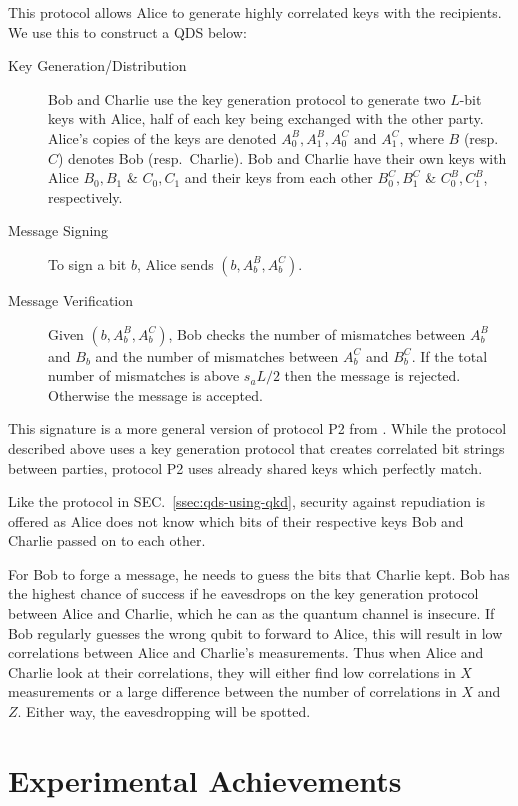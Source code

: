 \documentclass[%
 reprint,
 amsmath,amssymb,
 aps,
 pra,
]{revtex4-1}
\begin{document}
This protocol allows Alice to generate highly correlated keys with the recipients. We use this to construct a QDS below:

\begin{description}
\item[Key Generation/Distribution]Bob and Charlie use the key generation protocol to generate two $L$-bit keys with Alice, half of each key being exchanged with the other party. Alice's copies of the keys are denoted $A^B_0, A^B_1, A^C_0 \text{ and } A^C_1$, where $B$ (resp.\ $C$) denotes Bob (resp.\ Charlie). Bob and Charlie have their own keys with Alice $B_0, B_1$ \& $C_0, C_1$ and their keys from each other $B^C_0, B^C_1$ \& $C^B_0, C^B_1$, respectively.
\item[Message Signing]To sign a bit $b$, Alice sends $(b, A^B_b, A^C_b)$.
\item[Message Verification]Given $(b, A^B_b, A^C_b)$, Bob checks the number of mismatches between $A^B_b$ and $B_b$ and the number of mismatches between $A^C_b$ and $B^C_b$. If the total number of mismatches is above $s_aL/2$ then the message is rejected. Otherwise the message is accepted.
\end{description}

This signature is a more general version of protocol P2 from \cite{PhysRevA.91.042304}. While the protocol described above uses a key generation protocol that creates correlated bit strings between parties, protocol P2 uses already shared keys which perfectly match.

Like the protocol in SEC.\ \ref{ssec:qds-using-qkd}, security against repudiation is offered as Alice does not know which bits of their respective keys Bob and Charlie passed on to each other.

For Bob to forge a message, he needs to guess the bits that Charlie kept. Bob has the highest chance of success if he eavesdrops on the key generation protocol between Alice and Charlie, which he can as the quantum channel is insecure. If Bob regularly guesses the wrong qubit to forward to Alice, this will result in low correlations between Alice and Charlie's measurements. Thus when Alice and Charlie look at their correlations, they will either find low correlations in $X$ measurements or a large difference between the number of correlations in $X$ and $Z$. Either way, the eavesdropping will be spotted.

\section{Experimental Achievements}
\label{sec:experiments}
\end{document}
